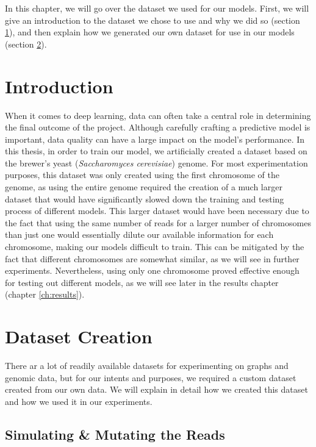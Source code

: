 \documentclass[times, utf8, diplomski, english]{fer_eng}
\begin{document}
In this chapter, we will go over the dataset we used for our models. First, we will give an introduction to the dataset we chose to use and why we did so (section \ref{sec:introduction}), and then explain how we generated our own dataset for use in our models (section \ref{sec:dataset creation}).

\section{Introduction}
\label{sec:introduction}

When it comes to deep learning, data can often take a central role in determining the final outcome of the project. Although carefully crafting a predictive model is important, data quality can have a large impact on the model's performance. In this thesis, in order to train our model, we artificially created a dataset based on the brewer's yeast (\textit{Saccharomyces cerevisiae}) genome. For most experimentation purposes, this dataset was only created using the first chromosome of the genome, as using the entire genome required the creation of a much larger dataset that would have significantly slowed down the training and testing process of different models. This larger dataset would have been necessary due to the fact that using the same number of reads for a larger number of chromosomes than just one would essentially dilute our available information for each chromosome, making our models difficult to train. This can be mitigated by the fact that different chromosomes are somewhat similar, as we will see in further experiments. Nevertheless, using only one chromosome proved effective enough for testing out different models, as we will see later in the results chapter (chapter \ref{ch:results}).

\section{Dataset Creation}
\label{sec:dataset creation}

There ar a lot of readily available datasets for experimenting on graphs and genomic data, but for our intents and purposes, we required a custom dataset created from our own data. We will explain in detail how we created this dataset and how we used it in our experiments.

\subsection{Simulating \& Mutating the Reads}
\end{document}
